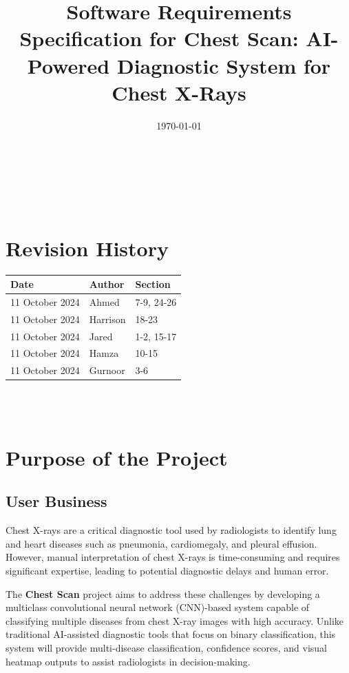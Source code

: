 \documentclass[12pt]{article}
\begin{document}
\title{Software Requirements Specification for Chest Scan: AI-Powered Diagnostic System for Chest X-Rays} %
\author{\authname}
\date{\today}

\maketitle
{}

~\newpage

\tableofcontents %

~\newpage

\section*{Revision History}

\begin{tabularx}{\textwidth}{p{3cm}p{2cm}X}
\toprule {\textbf{Date}} & {Author} & {Section}\\
\midrule
11 October 2024 & Ahmed & 7-9, 24-26 \\
11 October 2024 & Harrison & 18-23 \\
11 October 2024 & Jared & 1-2, 15-17 \\
11 October 2024 & Hamza & 10-15 \\
11 October 2024 & Gurnoor & 3-6 \\
\bottomrule
\end{tabularx}

~\\

~\newpage
\section{Purpose of the Project}

\subsection{User Business}
Chest X-rays are a critical diagnostic tool used by radiologists to identify lung and heart diseases such as pneumonia, cardiomegaly, and pleural effusion. However, manual interpretation of chest X-rays is time-consuming and requires significant expertise, leading to potential diagnostic delays and human error.

The \textbf{Chest Scan} project aims to address these challenges by developing a multiclass convolutional neural network (CNN)-based system capable of classifying multiple diseases from chest X-ray images with high accuracy. Unlike traditional AI-assisted diagnostic tools that focus on binary classification, this system will provide multi-disease classification, confidence scores, and visual heatmap outputs to assist radiologists in decision-making.
\end{document}
